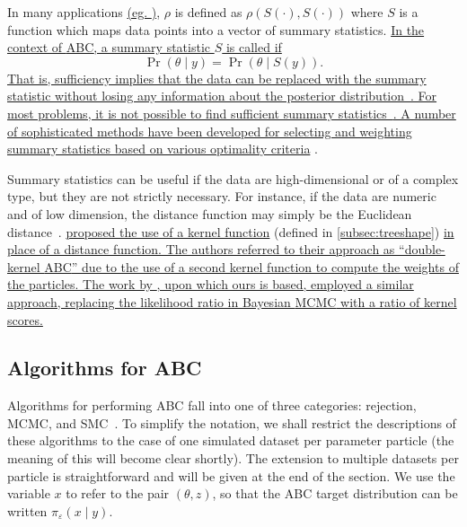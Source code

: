 In many applications {\color{blue}\uline{(eg. \autocite{fu1997estimating,
tanaka2006using})}}, $\rho$ is defined as $\rho(S(\cdot), S(\cdot))$ where $S$
is a function which maps data points into a vector of summary statistics.
{\color{blue}\uline{In the context of \gls{ABC}, a summary statistic $S$ is
called  if} 
\[
  \Pr(\theta \mid y) = \Pr(\theta \mid S(y)).
\]
\uline{That is, sufficiency implies that the data can be replaced with the
summary statistic without losing any information about the posterior
distribution~\autocite{marjoram2006modern}. For most problems, it is not
possible to find sufficient summary statistics~\autocite{marjoram2006modern}.
A number of sophisticated methods have been developed for selecting and
weighting summary statistics based on various optimality criteria}
\autocite[][and references therein]{aeschbacher2012novel,
blum2013comparative}}.

Summary statistics can be useful if the data are high-dimensional or of a
complex type, but they are not strictly necessary. For instance, if the data
are numeric and of low dimension, the distance function may simply be the
Euclidean distance~\autocite{sisson2007sequential}.
{\color{blue}\textcite{park2015k2} \uline{proposed the use of a kernel function}
(defined in \cref{subsec:treeshape}) \uline{in place of a distance function.
The authors referred to their approach as ``double-kernel \gls{ABC}'' due to
the use of a second kernel function to compute the weights of the particles.
The work by \textcite{poon2015phylodynamic}, upon which ours is based, employed
a similar approach, replacing the likelihood ratio in Bayesian \gls{MCMC} with
a ratio of kernel scores.}}

\subsection{Algorithms for ABC}
\label{subsec:abcalg}

Algorithms for performing \gls{ABC} fall into one of three categories:
rejection, \gls{MCMC}, and \gls{SMC}~\autocite{marin2012approximate}. To
simplify the notation, we shall restrict the descriptions of these algorithms
to the case of one simulated dataset per parameter particle (the meaning of
this will become clear shortly). The extension to multiple datasets per
particle is straightforward and will be given at the end of the section. We use
the variable $x$ to refer to the pair $(\theta, z)$, so that the \gls{ABC}
target distribution can be written $\pi_\varepsilon(x \mid y)$.

